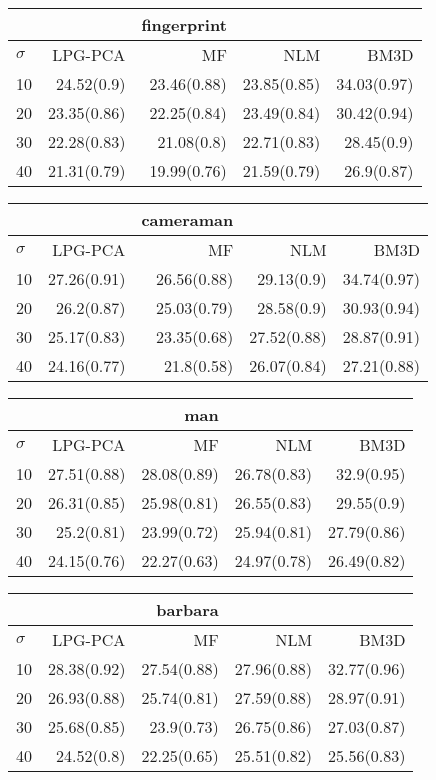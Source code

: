 \noindent\begin{minipage}{.5\linewidth}
\begin{tabular}{lrrrr}
\toprule &&fingerprint\\ \midrule
$\sigma$&LPG-PCA&MF&NLM&BM3D\\
\midrule
10&24.52(0.9)&23.46(0.88)&23.85(0.85)&34.03(0.97)\\
20&23.35(0.86)&22.25(0.84)&23.49(0.84)&30.42(0.94)\\
30&22.28(0.83)&21.08(0.8)&22.71(0.83)&28.45(0.9)\\
40&21.31(0.79)&19.99(0.76)&21.59(0.79)&26.9(0.87)\\
\bottomrule
\end{tabular}
\end{minipage}
\noindent\begin{minipage}{.5\linewidth}
\begin{tabular}{lrrrr}
\toprule &&cameraman\\ \midrule
$\sigma$&LPG-PCA&MF&NLM&BM3D\\
\midrule
10&27.26(0.91)&26.56(0.88)&29.13(0.9)&34.74(0.97)\\
20&26.2(0.87)&25.03(0.79)&28.58(0.9)&30.93(0.94)\\
30&25.17(0.83)&23.35(0.68)&27.52(0.88)&28.87(0.91)\\
40&24.16(0.77)&21.8(0.58)&26.07(0.84)&27.21(0.88)\\
\bottomrule
\end{tabular}
\end{minipage}
\noindent\begin{minipage}{.5\linewidth}
\begin{tabular}{lrrrr}
\toprule &&man\\ \midrule
$\sigma$&LPG-PCA&MF&NLM&BM3D\\
\midrule
10&27.51(0.88)&28.08(0.89)&26.78(0.83)&32.9(0.95)\\
20&26.31(0.85)&25.98(0.81)&26.55(0.83)&29.55(0.9)\\
30&25.2(0.81)&23.99(0.72)&25.94(0.81)&27.79(0.86)\\
40&24.15(0.76)&22.27(0.63)&24.97(0.78)&26.49(0.82)\\
\bottomrule
\end{tabular}
\end{minipage}
\noindent\begin{minipage}{.5\linewidth}
\begin{tabular}{lrrrr}
\toprule &&barbara\\ \midrule
$\sigma$&LPG-PCA&MF&NLM&BM3D\\
\midrule
10&28.38(0.92)&27.54(0.88)&27.96(0.88)&32.77(0.96)\\
20&26.93(0.88)&25.74(0.81)&27.59(0.88)&28.97(0.91)\\
30&25.68(0.85)&23.9(0.73)&26.75(0.86)&27.03(0.87)\\
40&24.52(0.8)&22.25(0.65)&25.51(0.82)&25.56(0.83)\\
\bottomrule
\end{tabular}
\end{minipage}